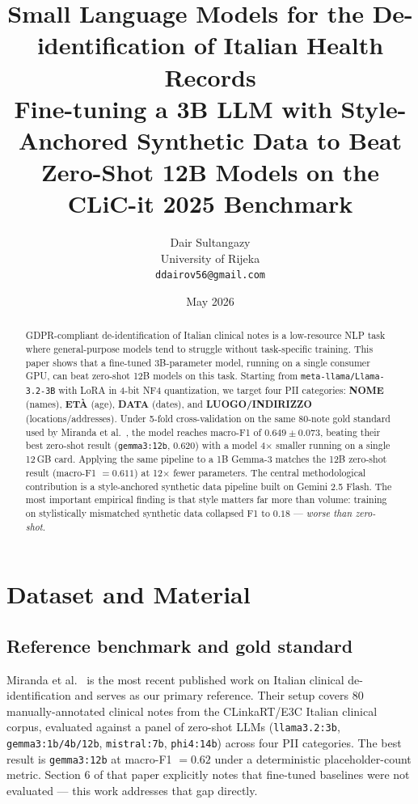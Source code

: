 \documentclass[11pt,a4paper]{article}
\title{\textbf{Small Language Models for the De-identification of Italian Health Records}\\[0.3em]
\large Fine-tuning a 3B LLM with Style-Anchored Synthetic Data to Beat\\
Zero-Shot 12B Models on the CLiC-it 2025 Benchmark}
\author{Dair Sultangazy\\
\small University of Rijeka\\
\small \texttt{ddairov56@gmail.com}}
\date{May 2026}
\begin{document}
\maketitle

\begin{abstract}
\noindent
GDPR-compliant de-identification of Italian clinical notes is a low-resource NLP task where general-purpose models tend to struggle without task-specific training. This paper shows that a fine-tuned 3B-parameter model, running on a single consumer GPU, can beat zero-shot 12B models on this task. Starting from \texttt{meta-llama/Llama-3.2-3B} with LoRA in 4-bit NF4 quantization, we target four PII categories: \textbf{NOME} (names), \textbf{ETÀ} (age), \textbf{DATA} (dates), and \textbf{LUOGO/INDIRIZZO} (locations/addresses). Under 5-fold cross-validation on the same 80-note gold standard used by Miranda et al.\ \cite{miranda2025mamma}, the model reaches macro-F1 of $0.649 \pm 0.073$, beating their best zero-shot result (\texttt{gemma3:12b}, 0.620) with a model 4$\times$ smaller running on a single 12\,GB card. Applying the same pipeline to a 1B Gemma-3 matches the 12B zero-shot result (macro-F1 $= 0.611$) at 12$\times$ fewer parameters. The central methodological contribution is a style-anchored synthetic data pipeline built on Gemini 2.5 Flash. The most important empirical finding is that style matters far more than volume: training on stylistically mismatched synthetic data collapsed F1 to $0.18$ — \textit{worse than zero-shot}.
\end{abstract}

\section{Dataset and Material}
\label{sec:data}

\subsection{Reference benchmark and gold standard}

Miranda et al.\ \cite{miranda2025mamma} is the most recent published work on Italian clinical de-identification and serves as our primary reference. Their setup covers 80 manually-annotated clinical notes from the CLinkaRT/E3C Italian clinical corpus, evaluated against a panel of zero-shot LLMs (\texttt{llama3.2:3b}, \texttt{gemma3:1b/4b/12b}, \texttt{mistral:7b}, \texttt{phi4:14b}) across four PII categories. The best result is \texttt{gemma3:12b} at macro-F1 $= 0.62$ under a deterministic placeholder-count metric. Section 6 of that paper explicitly notes that fine-tuned baselines were not evaluated — this work addresses that gap directly.
\end{document}
